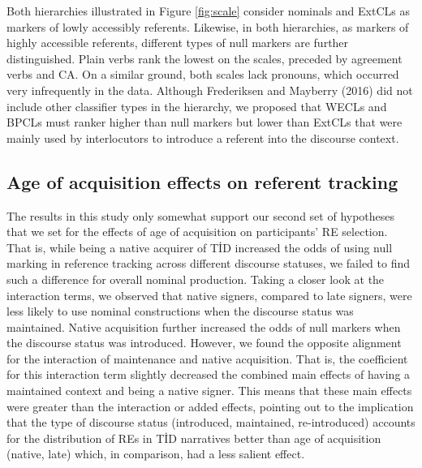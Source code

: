 \documentclass[]{elsarticle} %
\begin{document}
Both hierarchies illustrated in Figure \ref{fig:scale} consider nominals
and ExtCLs as markers of lowly accessibly referents. Likewise, in both
hierarchies, as markers of highly accessible referents, different types
of null markers are further distinguished. Plain verbs rank the lowest
on the scales, preceded by agreement verbs and CA. On a similar ground,
both scales lack pronouns, which occurred very infrequently in the data.
Although Frederiksen and Mayberry (2016) did not include other
classifier types in the hierarchy, we proposed that WECLs and BPCLs must
ranker higher than null markers but lower than ExtCLs that were mainly
used by interlocutors to introduce a referent into the discourse
context.

\hypertarget{age-of-acquisition-effects-on-referent-tracking}{%
\subsection{Age of acquisition effects on referent
tracking}\label{age-of-acquisition-effects-on-referent-tracking}}

The results in this study only somewhat support our second set of
hypotheses that we set for the effects of age of acquisition on
participants' RE selection. That is, while being a native acquirer of
TİD increased the odds of using null marking in reference tracking
across different discourse statuses, we failed to find such a difference
for overall nominal production. Taking a closer look at the interaction
terms, we observed that native signers, compared to late signers, were
less likely to use nominal constructions when the discourse status was
maintained. Native acquisition further increased the odds of null
markers when the discourse status was introduced. However, we found the
opposite alignment for the interaction of maintenance and native
acquisition. That is, the coefficient for this interaction term slightly
decreased the combined main effects of having a maintained context and
being a native signer. This means that these main effects were greater
than the interaction or added effects, pointing out to the implication
that the type of discourse status (introduced, maintained,
re-introduced) accounts for the distribution of REs in TİD narratives
better than age of acquisition (native, late) which, in comparison, had
a less salient effect.
\end{document}
